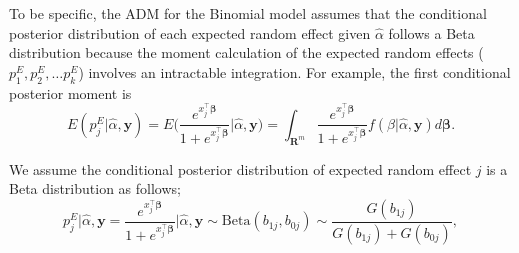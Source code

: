 \documentclass[article]{jss}
\begin{document}
To be specific, the ADM for the Binomial model assumes that the conditional posterior distribution of each expected random effect given $\hat{\alpha}$ follows a Beta distribution  because the moment calculation of the expected random effects ($p^E_{1}, p^E_{2}, \ldots p^E_{k}$) involves an intractable integration.  For example, the first conditional posterior moment is
\begin{equation}\label{priormoment1}
E(p^E_{j}\vert\hat{\alpha}, \boldsymbol{y})=E\bigg(\frac{e^{x_j^\top\boldsymbol{\beta}}}{1+e^{x_j^\top\boldsymbol{\beta}}}\bigg\vert\hat{\alpha}, \boldsymbol{y}\bigg)=\int_{\mathbf{R}^{m}} \frac{e^{x_j^\top\boldsymbol{\beta}}}{1+e^{x_j^\top\boldsymbol{\beta}}}f(\beta\vert\hat{\alpha}, \boldsymbol{y})d\boldsymbol{\beta}.
\end{equation}

We assume the conditional posterior distribution of expected random effect $j$ is a Beta distribution as follows;
\begin{equation}\label{admpriormean}
p^E_{j}\vert\hat{\alpha}, \boldsymbol{y}=\frac{e^{x_j^\top\boldsymbol{\beta}}}{1+e^{x_j^\top\boldsymbol{\beta}}}\bigg\vert\hat{\alpha}, \boldsymbol{y}\sim \textrm{Beta}(b_{1j}, b_{0j})\sim \frac{G(b_{1j})}{G(b_{1j})+G(b_{0j})},
\end{equation}
\end{document}
